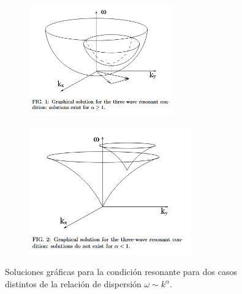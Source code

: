 \begin{figure}[!ht]
	\begin{minipage}[c]{0.5\textwidth}
		\begin{subfigure}{\textwidth}
			\centering
			\includegraphics[width=0.678\textwidth]{Figures/Antecedentes_teoricos/Resonancia_alpha_mayor}
			\captionsetup{width=0.8\textwidth}
			\subcaption{}
		\end{subfigure}
	\end{minipage}\begin{minipage}[c]{0.49\textwidth}
		\begin{subfigure}{\textwidth}
			\centering
			\includegraphics[width=0.76878\textwidth]{Figures/Antecedentes_teoricos/Resonancia_alpha_menor1}
			\captionsetup{width=0.8\textwidth}
			\subcaption{}
		\end{subfigure}
	\end{minipage}
	\caption{Soluciones gráficas para la condición resonante para dos casos distintos de la relación de dispersión $\omega\sim k^{\alpha}$.}
	\label{fig:solución_condición_resonante}
\end{figure}

